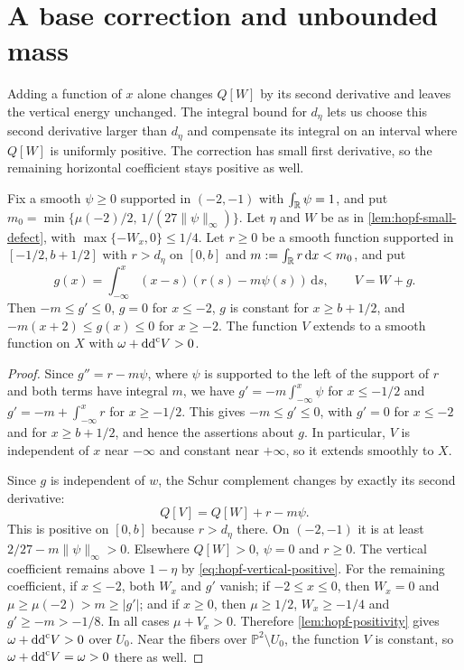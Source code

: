 \section{A base correction and unbounded mass}

Adding a function of $x$ alone changes $Q[W]$ by its second derivative and leaves the vertical energy unchanged. The integral bound for $d_\eta$ lets us choose this second derivative larger than $d_\eta$ and compensate its integral on an interval where $Q[W]$ is uniformly positive. The correction has small first derivative, so the remaining horizontal coefficient stays positive as well.

\begin{lemma}\label{lem:hopf-base-correction}
Fix a smooth $\psi\geq0$ supported in $(-2,-1)$ with $\int_\mathbb R\psi=1$, and put $m_0=\min\{\mu(-2)/2,\,1/(27\|\psi\|_\infty)\}$. Let $\eta$ and $W$ be as in \cref{lem:hopf-small-defect}, with $\max\{-W_x,0\}\leq1/4$. Let $r\geq0$ be a smooth function supported in $[-1/2,b+1/2]$ with $r>d_\eta$ on $[0,b]$ and $m:=\int_\mathbb R r\,\mathrm{d}x<m_0$, and put
\[
 g(x)=\int_{-\infty}^x(x-s)
                   (r(s)-m\psi(s))\,\mathrm{d}s,
 \qquad V=W+g.
\]
Then $-m\leq g'\leq0$, $g=0$ for $x\leq-2$, $g$ is constant for $x\geq b+1/2$, and $-m(x+2)\leq g(x)\leq0$ for $x\geq-2$. The function $V$ extends to a smooth function on $X$ with $\omega+\mathrm{dd}^{\mathrm{c}} V>0$.
\end{lemma}
\begin{proof}
Since $g''=r-m\psi$, where $\psi$ is supported to the left of the support of $r$ and both terms have integral $m$, we have $g'=-m\int_{-\infty}^x\psi$ for $x\leq-1/2$ and $g'=-m+\int_{-\infty}^xr$ for $x\geq-1/2$. This gives $-m\leq g'\leq0$, with $g'=0$ for $x\leq-2$ and for $x\geq b+1/2$, and hence the assertions about $g$. In particular, $V$ is independent of $x$ near $-\infty$ and constant near $+\infty$, so it extends smoothly to $X$.

Since $g$ is independent of $w$, the Schur complement changes by exactly its second derivative:
\[
 Q[V]=Q[W]+r-m\psi.
\]
This is positive on $[0,b]$ because $r>d_\eta$ there. On $(-2,-1)$ it is at least $2/27-m\|\psi\|_\infty>0$. Elsewhere $Q[W]>0$, $\psi=0$ and $r\geq0$.
The vertical coefficient remains above $1-\eta$ by \eqref{eq:hopf-vertical-positive}. For the remaining coefficient, if $x\leq-2$, both $W_x$ and $g'$ vanish; if $-2\leq x\leq0$, then $W_x=0$ and $\mu\geq\mu(-2)>m\geq|g'|$; and if $x\geq0$, then $\mu\geq1/2$, $W_x\geq-1/4$ and $g'\geq-m>-1/8$. In all cases $\mu+V_x>0$. Therefore \cref{lem:hopf-positivity} gives $\omega+\mathrm{dd}^{\mathrm{c}} V>0$ over $U_0$. Near the fibers over $\mathbb P^2\setminus U_0$, the function $V$ is constant, so $\omega+\mathrm{dd}^{\mathrm{c}} V=\omega>0$ there as well.
\end{proof}

